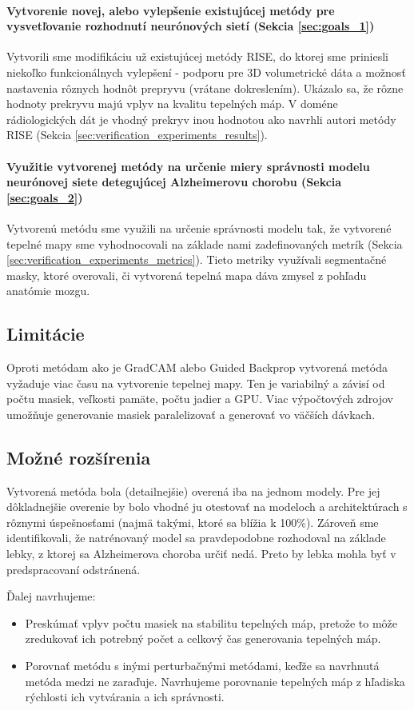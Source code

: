\paragraph{Vytvorenie novej, alebo vylepšenie existujúcej metódy pre vysvetľovanie rozhodnutí neurónových sietí (Sekcia \ref{sec:goals_1})}

Vytvorili sme modifikáciu už existujúcej metódy RISE, do ktorej sme priniesli niekoľko funkcionálnych vylepšení - podporu pre 3D volumetrické dáta a možnosť nastavenia rôznych hodnôt prepryvu (vrátane dokreslením). Ukázalo sa, že rôzne hodnoty prekryvu majú vplyv na kvalitu tepelných máp. V doméne rádiologických dát je vhodný prekryv inou hodnotou ako navrhli autori metódy RISE (Sekcia \ref{sec:verification_experiments_results}).

\paragraph{Využitie vytvorenej metódy na určenie miery správnosti modelu neurónovej siete detegujúcej Alzheimerovu chorobu (Sekcia \ref{sec:goals_2})}

Vytvorenú metódu sme využili na určenie správnosti modelu tak, že vytvorené tepelné mapy sme vyhodnocovali na základe nami zadefinovaných metrík (Sekcia \ref{sec:verification_experiments_metrics}). Tieto metriky využívali segmentačné masky, ktoré overovali, či vytvorená tepelná mapa dáva zmysel z pohľadu anatómie mozgu.

\subsection{Limitácie}

Oproti metódam ako je GradCAM alebo Guided Backprop vytvorená metóda vyžaduje viac času na vytvorenie tepelnej mapy. Ten je variabilný a závisí od počtu masiek, veľkosti pamäte, počtu jadier a GPU. Viac výpočtových zdrojov umožňuje generovanie masiek paralelizovať a generovať vo väčších dávkach.

\subsection{Možné rozšírenia}

Vytvorená metóda bola (detailnejšie) overená iba na jednom modely. Pre jej dôkladnejšie overenie by bolo vhodné ju otestovať na modeloch a architektúrach s rôznymi úspešnosťami (najmä takými, ktoré sa blížia k 100\%). Zároveň sme identifikovali, že natrénovaný model sa pravdepodobne rozhodoval na základe lebky, z ktorej sa Alzheimerova choroba určiť nedá. Preto by lebka mohla byť v predspracovaní odstránená.

Ďalej navrhujeme:

\begin{itemize}
    \item Preskúmať vplyv počtu masiek na stabilitu tepelných máp, pretože to môže zredukovať ich potrebný počet a celkový čas generovania tepelných máp.
    \item Porovnať metódu s inými perturbačnými metódami, keďže sa navrhnutá metóda medzi ne zaraďuje. Navrhujeme porovnanie tepelných máp z hľadiska rýchlosti ich vytvárania a ich správnosti.
\end{itemize}
